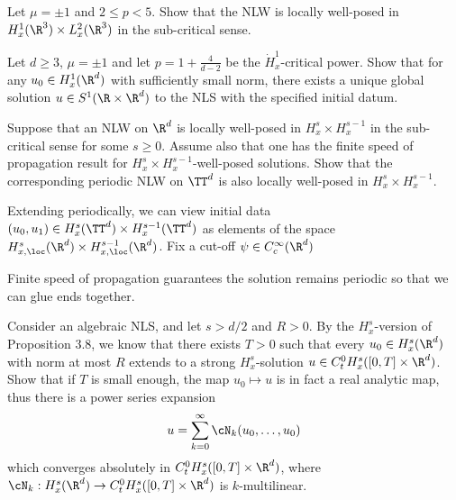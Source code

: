 \begin{statement}
	Let $\mu = \pm 1$ and $2 \leq p < 5$. Show that the NLW is locally well-posed in $H^1_x (\R^3) \times L^2_x (\R^3)$ in the sub-critical sense. 
\end{statement}

\begin{solution}

\end{solution}

\begin{statement}
	Let $d \geq 3$, $\mu = \pm 1$ and let $p = 1 + \tfrac{4}{d - 2}$ be the $\dot H^1_x$-critical power. Show that for any $u_0 \in H^1_x (\R^d)$ with sufficiently small norm, there exists a unique global solution $u \in S^1 (\R \times \R^d)$ to the NLS with the specified initial datum. 
\end{statement}

\begin{solution}

\end{solution}

\begin{statement}
	Suppose that an NLW on $\R^d$ is locally well-posed in $H^s_x \times H^{s - 1}_x$ in the sub-critical sense for some $s \geq 0$. Assume also that one has the finite speed of propagation result for $H^s_x \times H^{s - 1}_x$-well-posed solutions. Show that the corresponding periodic NLW on $\TT^d$ is also locally well-posed in $H^s_x \times H^{s - 1}_x$. 
\end{statement}

\begin{solution}
	Extending periodically, we can view initial data $(u_0, u_1) \in H^s_x (\TT^d) \times H^{s - 1}_x (\TT^d)$ as elements of the space $H^s_{x, \loc} (\R^d) \times H^{s - 1}_{x, \loc} (\R^d)$. Fix a cut-off $\psi \in C^\infty_c (\R^d)$ 
	
	Finite speed of propagation guarantees the solution remains periodic so that we can glue ends together. 
\end{solution}


\begin{statement}
	Consider an algebraic NLS, and let $s > d/2$ and $R > 0$. By the $H^s_x$-version of Proposition 3.8, we know that there exists $T  >0$ such that every $u_0 \in H^s_x (\R^d)$ with norm at most $R$ extends to a strong $H^s_x$-solution $u \in C^0_t H^s_x ([0, T] \times \R^d)$. Show that if $T$ is small enough, the map $u_0 \mapsto u$ is in fact a real analytic map, thus there is a power series expansion 
		\[ u = \sum_{k = 0}^\infty \cN_k (u_0, \dots, u_0) \]
	which converges absolutely in $C^0_t H^s_x ([0, T] \times \R^d)$, where $\cN_k: H^s_x (\R^d) \to C^0_t H^s_x ([0, T] \times \R^d)$ is $k$-multilinear. 
\end{statement}

